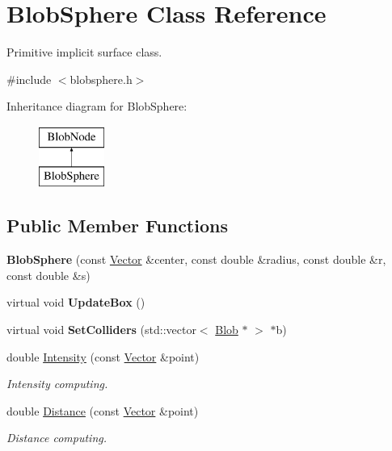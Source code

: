 \hypertarget{class_blob_sphere}{
\section{BlobSphere Class Reference}
\label{class_blob_sphere}
}


Primitive implicit surface class.  




{\ttfamily \#include $<$blobsphere.h$>$}

Inheritance diagram for BlobSphere:\begin{figure}[H]
\begin{center}
\leavevmode
\includegraphics[height=2.000000cm]{class_blob_sphere}
\end{center}
\end{figure}
\subsection*{Public Member Functions}
\begin{DoxyCompactItemize}
\item 
\hypertarget{class_blob_sphere_a5181c17fc3b1460d9bf46852763c8050}{
{\bfseries BlobSphere} (const \hyperlink{class_vector}{Vector} \&center, const double \&radius, const double \&r, const double \&s)}
\label{class_blob_sphere_a5181c17fc3b1460d9bf46852763c8050}

\item 
\hypertarget{class_blob_sphere_a4e1a10b6e809645700d3217e529d3f4c}{
virtual void {\bfseries UpdateBox} ()}
\label{class_blob_sphere_a4e1a10b6e809645700d3217e529d3f4c}

\item 
\hypertarget{class_blob_sphere_af439d6400685ae17f2c3acb2f2f2f632}{
virtual void {\bfseries SetColliders} (std::vector$<$ \hyperlink{class_blob}{Blob} $\ast$ $>$ $\ast$b)}
\label{class_blob_sphere_af439d6400685ae17f2c3acb2f2f2f632}

\item 
double \hyperlink{class_blob_sphere_a5bcf3148ee40b0475bcafbfc12d0afb2}{Intensity} (const \hyperlink{class_vector}{Vector} \&point)
\begin{DoxyCompactList}\small\item\em Intensity computing. \item\end{DoxyCompactList}\item 
double \hyperlink{class_blob_sphere_a8cb2d5945ea7f852fd6f307bc39038da}{Distance} (const \hyperlink{class_vector}{Vector} \&point)
\begin{DoxyCompactList}\small\item\em Distance computing. \item\end{DoxyCompactList}\end{DoxyCompactItemize}



